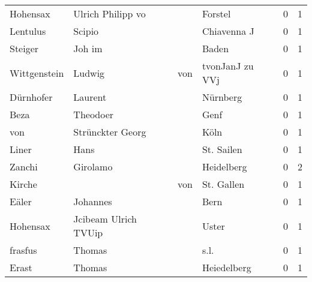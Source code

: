 \begin{tabular}{llllrr}
                 Hohensax &                  Ulrich Philipp vo &             &                                     Forstel &          0 &         1 \\
                 Lentulus &                             Scipio &             &                                 Chiavenna J &          0 &         1 \\
                  Steiger &                             Joh im &             &                                       Baden &          0 &         1 \\
             Wittgenstein &                             Ludwig &         von &                             tvonJanJ zu VVj &          0 &         1 \\
                Dürnhofer &                            Laurent &             &                                    Nürnberg &          0 &         1 \\
                     Beza &                           Theodoer &             &                                        Genf &          0 &         1 \\
                      von &                   Strünckter Georg &             &                                        Köln &          0 &         1 \\
                    Liner &                               Hans &             &                                  St. Sailen &          0 &         1 \\
                   Zanchi &                           Girolamo &             &                                  Heidelberg &          0 &         2 \\
                   Kirche &                                    &         von &                                  St. Gallen &          0 &         1 \\
                    Eäler &                           Johannes &             &                                        Bern &          0 &         1 \\
                 Hohensax &               Jcibeam Ulrich TVUip &             &                                       Uster &          0 &         1 \\
                  frasfus &                             Thomas &             &                                        s.l. &          0 &         1 \\
                    Erast &                             Thomas &             &                                 Heiedelberg &          0 &         1 \\

\end{tabular}
